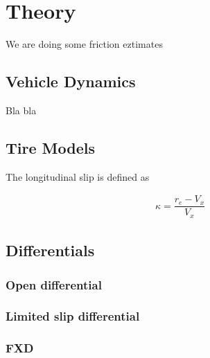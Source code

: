 \chapter{Theory}


We are doing some friction eztimates

\section{Vehicle Dynamics}

Bla bla \cite{Reference1}

\section{Tire Models}

The longitudinal slip is defined as

 \begin{align*}
	 \kappa = \dfrac{r_{e}-V_{x}}{V_{x}}
\end{align*}

\section{Differentials}

\subsection{Open differential}

\subsection{Limited slip differential}

\subsection{FXD}